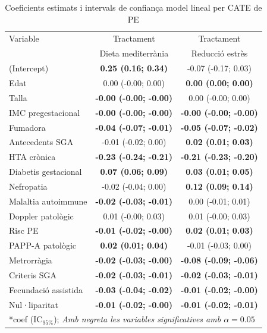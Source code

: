 \documentclass[../main.tex]{subfiles}
\begin{document}
    \begin{table}[H]
        \centering
        \captionsetup{font=small}        
        \caption{Coeficients estimats i intervals de confiança model lineal per CATE de PE}
        \label{tab:coef_PE}
        \centering
        \scriptsize
        \begin{tabular}[t]{p{4cm} c @{\hspace{1cm}} c}
        \toprule
        Variable & Tractament  & Tractament \\
         & Dieta mediterrània & Reducció estrès \\
        \midrule
        (Intercept) & \textbf{0.25 (0.16; 0.34)} & -0.07 (-0.17; 0.03)\\
        Edat & 0.00 (-0.00; 0.00) & \textbf{0.00 (0.00; 0.00)}\\
        Talla & \textbf{-0.00 (-0.00; -0.00)} & 0.00 (-0.00; 0.00)\\
        IMC pregestacional & \textbf{-0.00 (-0.00; -0.00)} & \textbf{-0.00 (-0.00; -0.00)}\\
        Fumadora & \textbf{-0.04 (-0.07; -0.01)} & \textbf{-0.05 (-0.07; -0.02)}\\
        \addlinespace
        Antecedents SGA & -0.01 (-0.02; 0.00) & \textbf{0.02 (0.01; 0.03)}\\
        HTA crònica & \textbf{-0.23 (-0.24; -0.21)} & \textbf{-0.21 (-0.23; -0.20)}\\
        Diabetis gestacional & \textbf{0.07 (0.06; 0.09)} & \textbf{0.03 (0.01; 0.05)}\\
        Nefropatia & -0.02 (-0.04; 0.00) & \textbf{0.12 (0.09; 0.14)}\\
        Malaltia autoimmune & \textbf{-0.02 (-0.03; -0.01)} & 0.00 (-0.01; 0.01)\\
        \addlinespace
        Doppler patològic & 0.01 (-0.00; 0.03) & 0.01 (-0.00; 0.03)\\
        Risc PE & \textbf{-0.01 (-0.02; -0.00)} & \textbf{0.02 (0.01; 0.03)}\\
        PAPP-A patològic & \textbf{0.02 (0.01; 0.04)} & -0.01 (-0.03; 0.00)\\
        Metrorràgia & \textbf{-0.02 (-0.03; -0.00)} & \textbf{-0.08 (-0.09; -0.06)}\\
        Criteris SGA & \textbf{-0.02 (-0.03; -0.01)} & \textbf{-0.02 (-0.03; -0.01)}\\
        \addlinespace
        Fecundació assistida & \textbf{-0.03 (-0.04; -0.02)} & \textbf{-0.01 (-0.02; -0.00)}\\
        Nul·liparitat & \textbf{-0.01 (-0.02; -0.00)} & \textbf{-0.01 (-0.02; -0.01)}\\
        \bottomrule
        \multicolumn{3}{l}{\rule{0pt}{1em}*coef (IC$_{95\%}$); \textit{Amb negreta les variables significatives amb $\alpha=0.05$}}
        \end{tabular}
    \end{table}
\end{document}
